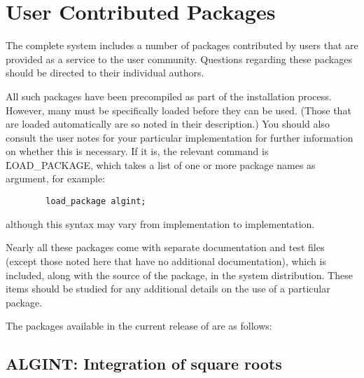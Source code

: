 %
%



\chapter{User Contributed Packages} 
\label{chap-user}
The complete {\REDUCE} system includes a number of packages contributed by
users that are provided as a service to the user community.  Questions
regarding these packages should be directed to their individual authors.

All such packages have been precompiled as part of the installation process.
However, many must be specifically loaded before they can be used. (Those
that are loaded automatically are so noted in their description.) You should
also consult the user notes for your particular implementation for further
information on whether this is necessary.  If it is, the relevant command is
\f{LOAD\_PACKAGE}, which takes a list of one or
more package names as argument, for example:

\begin{verbatim}
        load_package algint;
\end{verbatim}
although this syntax may vary from implementation to implementation.

Nearly all these packages come with separate documentation and test files
(except those noted here that have no additional documentation), which is
included, along with the source of the package, in the {\REDUCE} system
distribution.  These items should be studied for any additional details on
the use of a particular package.

\let\origsectionmark=\sectionmark
\def\sectionmark#1{}


The packages available in the current release of {\REDUCE} are as follows:

\newpage

\section{ALGINT: Integration of square roots} 
\label{ALGINT}

